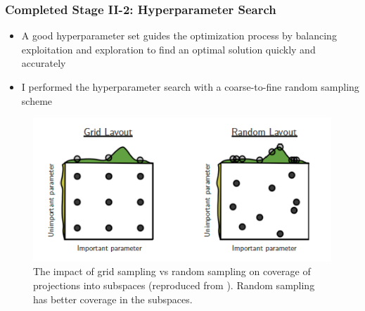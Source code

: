 \begin{frame}
    \frametitle{Completed Stage II-2: Hyperparameter Search}
    \begin{itemize}
        \item A good hyperparameter set guides the optimization process by 
        balancing exploitation and exploration to find an optimal solution quickly 
        and accurately
        \item I performed the hyperparameter search with a coarse-to-fine random 
        sampling scheme
    \end{itemize}
    \begin{figure}[]
        \centering
        \includegraphics[width=0.5\linewidth]{../docs/figures/random_vs_grid_sampling.png} 
        \caption{The impact of grid sampling vs random sampling on coverage of projections 
        into subspaces (reproduced from \cite{jordan_hyperparameter_2017}). 
        Random sampling has better coverage in the subspaces.}
    \end{figure}
\end{frame}


